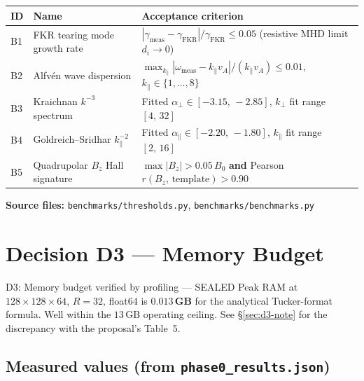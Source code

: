 \documentclass[11pt, a4paper]{article}
\begin{document}
\begin{center}
\begin{tabular}{p{0.6cm} p{4.5cm} p{7cm}}
\toprule
ID & Name & Acceptance criterion \\
\midrule
B1 & FKR tearing mode growth rate &
  $|\gamma_\text{meas} - \gamma_\text{FKR}|/\gamma_\text{FKR} \leq 0.05$
  (resistive MHD limit $d_i \to 0$) \\[4pt]
B2 & Alfvén wave dispersion &
  $\max_{k_\parallel} |\omega_\text{meas} - k_\parallel v_A|/(k_\parallel v_A)
  \leq 0.01$,\;
  $k_\parallel \in \{1,\ldots,8\}$ \\[4pt]
B3 & Kraichnan $k^{-3}$ spectrum &
  Fitted $\alpha_\perp \in [-3.15,\,-2.85]$,\;
  $k_\perp$ fit range $[4,\,32]$ \\[4pt]
B4 & Goldreich--Sridhar $k_\parallel^{-2}$ &
  Fitted $\alpha_\parallel \in [-2.20,\,-1.80]$,\;
  $k_\parallel$ fit range $[2,\,16]$ \\[4pt]
B5 & Quadrupolar $B_z$ Hall signature &
  $\max|B_z| > 0.05\,B_0$ \textbf{and}
  Pearson $r(B_z,\,\text{template}) > 0.90$ \\
\bottomrule
\end{tabular}
\end{center}

\noindent\textbf{Source files:}
\texttt{benchmarks/thresholds.py},
\texttt{benchmarks/benchmarks.py}

\section{Decision D3 --- Memory Budget}
\label{sec:d3}

\begin{sealbox}{D3: Memory budget verified by profiling --- SEALED}
Peak RAM at $128\times128\times64$, $R=32$, float64 is
$\mathbf{0.013\,\text{GB}}$ for the analytical Tucker-format formula.
Well within the $13\,\text{GB}$ operating ceiling.
See \S\ref{sec:d3-note} for the discrepancy with the proposal's Table~5.
\end{sealbox}

\subsection{Measured values (from \texttt{phase0\_results.json})}
\end{document}
